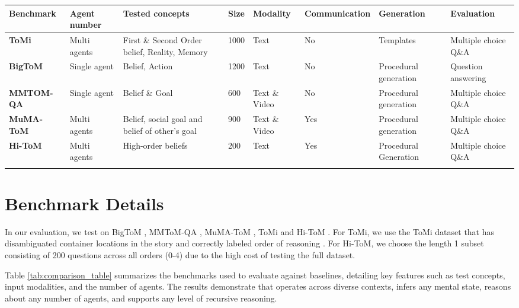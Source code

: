 \begin{table*}[t!]
  \begin{center}
    \begin{small}
    \begin{tabular}{p{2cm} p{1.5cm} p{2.5cm} p{0.5cm} p{1cm} p{2cm} p{2cm} p{2cm}}
    \toprule
      \textbf{Benchmark} & \textbf{Agent number} & \textbf{Tested concepts} & \textbf{Size} & \textbf{Modality} & \textbf{Communication} & \textbf{Generation} & \textbf{Evaluation}\\
    \hline
        \textbf{ToMi \cite{le2019revisiting}} &  Multi agents & First \& Second Order belief, Reality, Memory & 1000 & Text & No & Templates & Multiple choice Q\&A \\ \hline
        \textbf{BigToM \cite{gandhi2024understanding}} & Single agent & Belief, Action & 1200 & Text & No & Procedural generation & Question answering \\ \hline
        \textbf{MMTOM-QA \cite{jin2024mmtom}} & Single agent & Belief \& Goal & 600 & Text \& Video & No & Procedural generation & Multiple choice Q\&A \\ \hline
        \textbf{MuMA-ToM \citep{shi2024muma}} & Multi agents & Belief, social goal and belief of other's goal & 900 & Text \& Video & Yes & Procedural generation & Multiple choice Q\&A \\ \hline
        \textbf{Hi-ToM \cite{he2023hi}} & Multi agents & High-order beliefs & 200 & Text & Yes & Procedural Generation & Multiple choice Q\&A \\ 
    \bottomrule \\
    \end{tabular}
    \end{small}
  \caption{Summary of the ToM benchmarks used in the experiments.}
    \label{tab:comparison_table}
  \end{center}
  \vspace{-10pt}
\end{table*}


\section{Benchmark Details}
\label{sec:bench_details}

In our evaluation, we test \ours on BigToM \citep{gandhi2024understanding}, MMToM-QA \citep{jin2024mmtom}, MuMA-ToM \citep{shi2024muma}, ToMi \citep{le2019revisiting} and Hi-ToM \citep{he2023hi}. For ToMi, we use the ToMi dataset that has disambiguated container locations in the story and correctly labeled order of reasoning \cite{arodi2021textual, sap2022neural}.
For Hi-ToM, we choose the length 1 subset consisting of 200 questions across all orders (0-4)  due to the high cost of testing the full dataset. 


Table \ref{tab:comparison_table} summarizes the benchmarks used to evaluate \ours against baselines, detailing key features such as test concepts, input modalities, and the number of agents. The results demonstrate that \ours operates across diverse contexts, infers any mental state, reasons about any number of agents, and supports any level of recursive reasoning.
